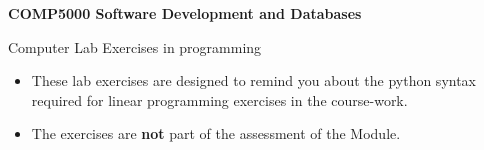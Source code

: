\documentclass[12pt,a4paper]{article}
\begin{document}
\sffamily 


\thispagestyle{empty}


\begin{center}
{\Huge{\textbf{COMP5000 Software Development and Databases}}}

\vspace{1cm}

{\huge Computer Lab Exercises in programming}

\vspace{2cm}

\vfill

\end{center}




\begin{itemize}

\item These lab exercises are designed to remind you about the python syntax
      required for linear programming exercises in the course-work.


\item The exercises are \textbf{not} part of the assessment of the Module.

\end{itemize}

\newpage
\thispagestyle{empty}
\addtocounter{section}{0} %


 
 
 
 
 
\end{document}

